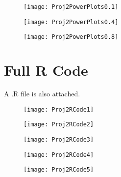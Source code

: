 \documentclass[12pt, letterpaper]{article}
\theoremstyle{definition}
\numberwithin{equation}{section}
\newcommand{\+}[1]{+_{\scalebox{.375}{#1}}}
\newcommand{\1}{\mathbbm{1}}
\begin{document}
\newpage
\begin{figure}[H]
	\centering
	\texttt{[image: Proj2PowerPlots0.1]}
	\label{figure.powerlot0.1}
\end{figure}
\vspace{-0.5cm}

\begin{figure}[H]
	\centering
	\texttt{[image: Proj2PowerPlots0.4]}
	\label{figure.powerplot0.4}
\end{figure}
\vspace{-0.5cm}

\begin{figure}[H]
	\centering
	\texttt{[image: Proj2PowerPlots0.8]}
	\label{figure.powerplot0.8}
\end{figure}





\newpage\section{Full R Code}\label{section.rcode}

A .R file is also attached.

\begin{figure}[H]
	\centering
	\texttt{[image: Proj2RCode1]}
\end{figure}

\begin{figure}[H]
	\centering
	\texttt{[image: Proj2RCode2]}
\end{figure}

\vspace{-0.5cm}
\begin{figure}[H]
	\centering
	\texttt{[image: Proj2RCode3]}
\end{figure}
\vspace{-0.5cm}

\begin{figure}[H]
	\centering
	\texttt{[image: Proj2RCode4]}
\end{figure}
\vspace{-0.5cm}

\begin{figure}[H]
	\centering
	\texttt{[image: Proj2RCode5]}
\end{figure}
\vspace{-0.5cm}
\end{document}
